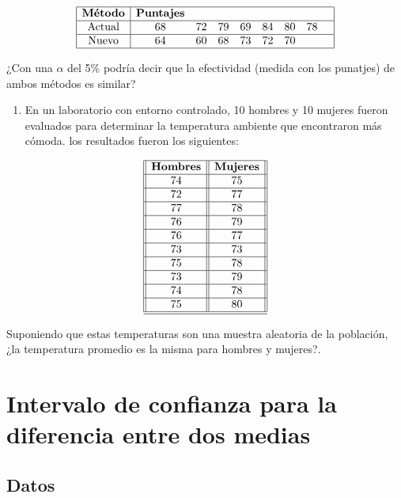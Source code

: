 \documentclass[
  a4paper,
  oneside,
  openany]{book}
\providecommand{\tightlist}{%
  \setlength{\itemsep}{0pt}\setlength{\parskip}{0pt}}
\begin{document}
\[
\begin{array}{|c| c c c c c c c c|} 
\hline 
\textbf{Método} &\textbf{Puntajes} &&&&& & & \\ 
 \hline
\mbox{Actual} & 68 & 72 & 79 & 69 & 84 & 80 & 78 &\\ 
 \hline
\mbox{Nuevo} & 64 & 60 & 68 & 73 & 72 & 70& & \\ 
\hline
\end{array}
\]

¿Con una \(\alpha\) del 5\% podría decir que la efectividad (medida con los punatjes) de ambos métodos es similar?

\begin{enumerate}
\def\labelenumi{\arabic{enumi}.}
\setcounter{enumi}{1}
\tightlist
\item
  En un laboratorio con entorno controlado, 10 hombres y 10 mujeres fueron evaluados para determinar la temperatura ambiente que encontraron más cómoda. los resultados fueron los siguientes:
\end{enumerate}

\[
\begin{array}{||c| |c||} 
\hline 
\textbf{Hombres} & \textbf{Mujeres} \\  
 \hline
74&75\\
 \hline
72&77\\
 \hline
77&78\\
 \hline
76&79\\
 \hline
76&77\\
 \hline
73&73\\
 \hline
75&78\\
 \hline
73&79\\
 \hline
74&78\\
 \hline
75&80\\
  \hline
\hline
\end{array}
\]

Suponiendo que estas temperaturas son una muestra aleatoria de la población, ¿la temperatura promedio es la misma para hombres y mujeres?.

\hypertarget{intervalo-de-confianza-para-la-diferencia-entre-dos-medias}{%
\chapter{Intervalo de confianza para la diferencia entre dos medias}\label{intervalo-de-confianza-para-la-diferencia-entre-dos-medias}}

\hypertarget{datos-6}{%
\section{Datos}\label{datos-6}}
\end{document}
